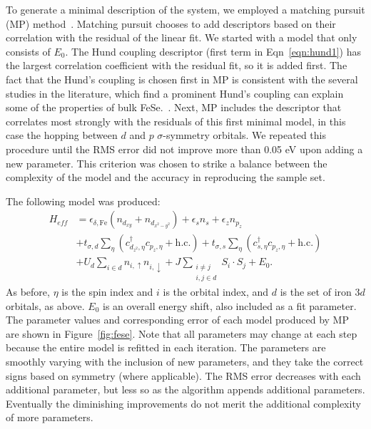 To generate a minimal description of the system, we employed a matching pursuit (MP) method~\cite{MP_Zhang1993}.
Matching pursuit chooses to add descriptors based on their correlation with the residual of the linear fit. 
We started with a model that only consists of $E_0$. 
The Hund coupling descriptor (first term in Eqn~\ref{eqn:hund1}) has the largest correlation coefficient with the residual fit, so it is added first.
The fact that the Hund's coupling is chosen first in MP is consistent with the several studies in the literature, which find a prominent Hund's coupling can explain some of the properties of bulk FeSe.~\cite{demedici_hunds_2011,de_medici_janus-faced_2011,georges_strong_2013,busemeyer_competing_2016}.
Next, MP includes the descriptor that correlates most strongly with the residuals of this first minimal model, in this case the hopping between $d$ and $p$ $\sigma$-symmetry orbitals. 
We repeated this procedure until the RMS error did not improve more than 0.05 eV upon adding a new parameter.
This criterion was chosen to strike a balance between the complexity of the model and the accuracy in reproducing the sample set.

The following model was produced:
\begin{align}
  H_{eff}
  &=
  \epsilon_{\delta,\mathrm{Fe}} (n_{d_{xy}} + n_{d_{x^2-y^2}})
  +
  \epsilon_s n_{s}
  +
  \epsilon_{z} n_{p_z}
  \nonumber \\
  &+ 
  t_{\sigma,d} \sum_{\eta} \left( c_{d_{z^2},\eta}^{\dagger} c_{p_z,\eta} + \text{h.c.} \right)
  +
  t_{\sigma,s} \sum_{\eta} \left(c_{s,\eta}^{\dagger}  c_{p_z,\eta} + \text{h.c.} \right)
  \nonumber \\
  &+
  U_d \sum_{i \in d} n_{i,\uparrow} n_{i,\downarrow} 
  +
  J \sum_{\substack{i\ne j \\i,j \in d}} S_i \cdot S_j
  +
  E_0. \label{eq:fesemodel}
\end{align}
As before, $\eta$ is the spin index and $i$ is the orbital index, and $d$ is the set of iron $3d$ orbitals, as above.
$E_0$ is an overall energy shift, also included as a fit parameter.
The parameter values and corresponding error of each model produced by MP are shown in Figure~\ref{fig:fese}.
Note that all parameters may change at each step because the entire model is refitted in each iteration.
The parameters are smoothly varying with the inclusion of new parameters, and they take the correct signs based on symmetry (where applicable). 
The RMS error decreases with each additional parameter, but less so as the algorithm appends additional parameters. 
Eventually the diminishing improvements do not merit the additional complexity of more parameters.


